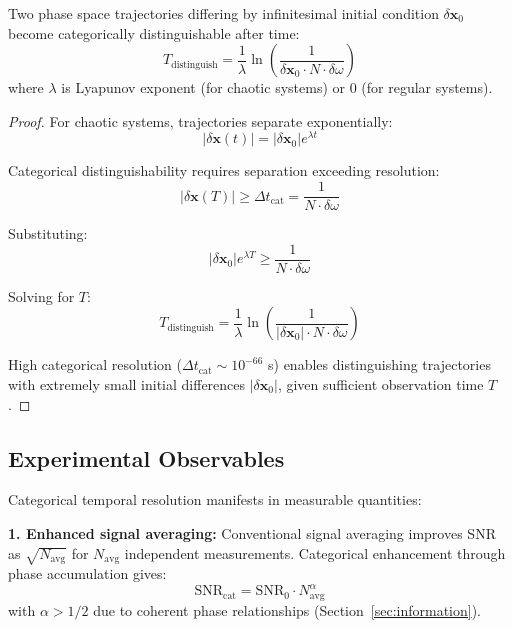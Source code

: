 \begin{theorem}
\label{thm:trajectory_distinguish}
Two phase space trajectories differing by infinitesimal initial condition $\delta\mathbf{x}_0$ become categorically distinguishable after time:
\begin{equation}
T_{\text{distinguish}} = \frac{1}{\lambda} \ln\left(\frac{1}{\delta\mathbf{x}_0 \cdot N \cdot \delta\omega}\right)
\end{equation}
where $\lambda$ is Lyapunov exponent (for chaotic systems) or 0 (for regular systems).
\end{theorem}

\begin{proof}
For chaotic systems, trajectories separate exponentially:
\begin{equation}
|\delta\mathbf{x}(t)| = |\delta\mathbf{x}_0| e^{\lambda t}
\end{equation}

Categorical distinguishability requires separation exceeding resolution:
\begin{equation}
|\delta\mathbf{x}(T)| \geq \Delta t_{\text{cat}} = \frac{1}{N \cdot \delta\omega}
\end{equation}

Substituting:
\begin{equation}
|\delta\mathbf{x}_0| e^{\lambda T} \geq \frac{1}{N \cdot \delta\omega}
\end{equation}

Solving for $T$:
\begin{equation}
T_{\text{distinguish}} = \frac{1}{\lambda} \ln\left(\frac{1}{|\delta\mathbf{x}_0| \cdot N \cdot \delta\omega}\right)
\end{equation}

High categorical resolution ($\Delta t_{\text{cat}} \sim 10^{-66}$ s) enables distinguishing trajectories with extremely small initial differences $|\delta\mathbf{x}_0|$, given sufficient observation time $T$.
\end{proof}



\subsection{Experimental Observables}

Categorical temporal resolution manifests in measurable quantities:

\textbf{1. Enhanced signal averaging:} Conventional signal averaging improves SNR as $\sqrt{N_{\text{avg}}}$ for $N_{\text{avg}}$ independent measurements. Categorical enhancement through phase accumulation gives:
\begin{equation}
\text{SNR}_{\text{cat}} = \text{SNR}_0 \cdot N_{\text{avg}}^{\alpha}
\end{equation}
with $\alpha > 1/2$ due to coherent phase relationships (Section~\ref{sec:information}).

